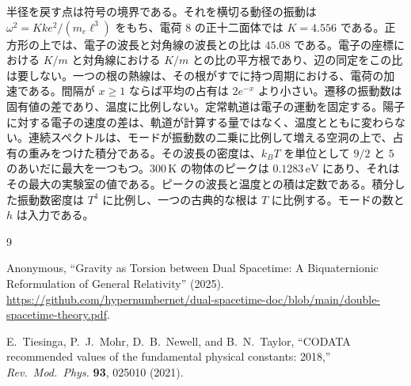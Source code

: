 \documentclass[a4paper]{article}
\begin{document}
半径を戻す点は符号の境界である。それを横切る動径の振動は \(\omega^{2}=K k e^{2}/(m_e\ell^{3})\) をもち、電荷 \(8\) の正十二面体では \(K=4.556\) である。正方形の上では、電子の波長と対角線の波長との比は \(45.08\) である。電子の座標における \(K/m\) と対角線における \(K/m\) との比の平方根であり、辺の同定をこの比は要しない。一つの根の熱線は、その根がすでに持つ周期における、電荷の加速である。間隔が \(x\ge 1\) ならば平均の占有は \(2e^{-x}\) より小さい。遷移の振動数は固有値の差であり、温度に比例しない。定常軌道は電子の運動を固定する。陽子に対する電子の速度の差は、軌道が計算する量ではなく、温度とともに変わらない。連続スペクトルは、モードが振動数の二乗に比例して増える空洞の上で、占有の重みをつけた積分である。その波長の密度は、\(k_B T\) を単位として \(9/2\) と \(5\) のあいだに最大を一つもつ。\(300\,\mathrm{K}\) の物体のピークは \(0.1283\,\mathrm{eV}\) にあり、それはその最大の実験室の値である。ピークの波長と温度との積は定数である。積分した振動数密度は \(T^{4}\) に比例し、一つの古典的な根は \(T\) に比例する。モードの数と \(h\) は入力である。

\begin{thebibliography}{9}

Anonymous,
``Gravity as Torsion between Dual Spacetime: A Biquaternionic Reformulation of General Relativity'' (2025).
\url{https://github.com/hypernumbernet/dual-spacetime-doc/blob/main/double-spacetime-theory.pdf}.

E.~Tiesinga, P.~J.~Mohr, D.~B.~Newell, and B.~N.~Taylor,
``CODATA recommended values of the fundamental physical constants: 2018,''
\textit{Rev.\ Mod.\ Phys.} \textbf{93}, 025010 (2021).

\end{thebibliography}
\end{document}
